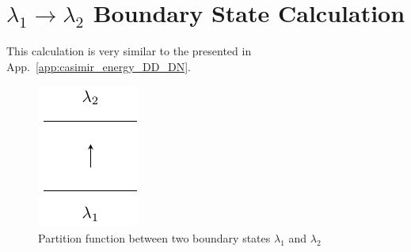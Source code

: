 \documentclass{article}
\begin{document}

\section{$\lambda_1 \rightarrow \lambda_2$ Boundary State Calculation}
\label{app:lambda_12}

This calculation is very similar to the presented in App.~\ref{app:casimir_energy_DD_DN}. 

\begin{figure}[h]
\centering
\includegraphics[width=\textwidth]{fig_part-lambda1-lambda2-2}
\caption{Partition function between two boundary states $\lambda_1$ and $\lambda_2$}
\label{fig:part-lambda1-lambda2-2}
\end{figure}
\end{document}
